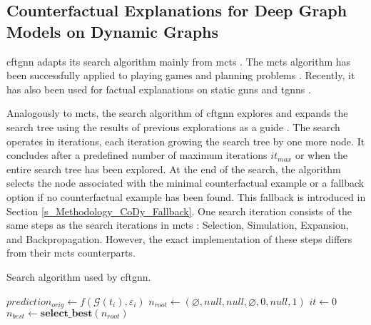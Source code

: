 \subsection{Counterfactual Explanations for Deep Graph Models on Dynamic Graphs}
\label{s_Methodology_CoDy}
\acrfull{cftgnn} adapts its search algorithm mainly from \gls{mcts} \cite{kocsis_bandit_2006, silver_mastering_2017}. The \gls{mcts} algorithm has been successfully applied to playing games \cite{silver_mastering_2017} and planning problems \cite{browne_survey_2012}. Recently, it has also been used for factual explanations on static \glspl{gnn} \cite{yuan_explainability_2021, zhang_gstarx_2022} and \glspl{tgnn} \cite{xia_explaining_2023}. 

Analogously to \gls{mcts}, the search algorithm of \gls{cftgnn} explores and expands the search tree using the results of previous explorations as a guide \cite{browne_survey_2012}. The search operates in iterations, each iteration growing the search tree by one more node. It concludes after a predefined number of maximum iterations $it_{max}$ or when the entire search tree has been explored. At the end of the search, the algorithm selects the node associated with the minimal counterfactual example or a fallback option if no counterfactual example has been found. This fallback is introduced in Section \ref{s_Methodology_CoDy_Fallback}. One search iteration consists of the same steps as the search iterations in \gls{mcts} \cite{browne_survey_2012}: Selection, Simulation, Expansion, and Backpropagation. However, the exact implementation of these steps differs from their \gls{mcts} counterparts.

{
\setlength{\algomargin}{1.25em}
\small
\begin{algorithm}[ht]
\caption{Search algorithm used by \gls{cftgnn}.}
\label{a_MCTS_Main}
    $prediction_{orig} \gets f(\mathcal{G}(t_i), \varepsilon_i)$\;
    $n_{root} \gets (\varnothing, null, null, \varnothing, 0, null, 1)$\;
    $it \gets 0$\;
    $n_{best} \gets \mathrm{\textbf{select\_best}}(n_{root})$\;
\end{algorithm}
}

